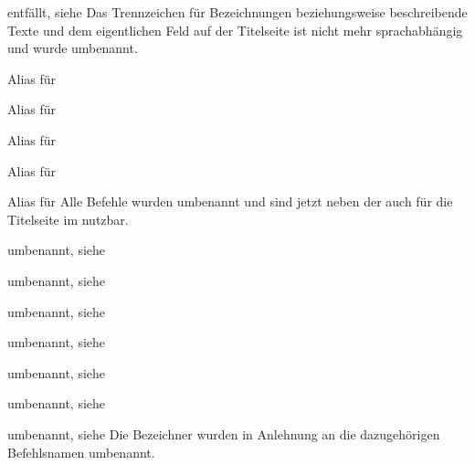 \begin{Declaration}{}{%
  entfällt, siehe %
}
\printdeclarationlist*%
%
Das Trennzeichen für Bezeichnungen beziehungsweise beschreibende Texte und dem 
eigentlichen Feld auf der Titelseite ist nicht mehr sprachabhängig und wurde 
umbenannt.
\end{Declaration}

\begin{Declaration}{}{%
  Alias für %
}
\begin{Declaration}{}{%
  Alias für %
}
\begin{Declaration}{}{%
  Alias für 
}
\begin{Declaration}{}{%
  Alias für 
}
\begin{Declaration}{}{%
  Alias für %
}
\printdeclarationlist*%
%
Alle Befehle wurden umbenannt und sind jetzt neben der \taskname{} auch für die 
Titelseite im \CD nutzbar.
\end{Declaration}
\end{Declaration}
\end{Declaration}
\end{Declaration}
\end{Declaration}

\begin{Declaration}{}{umbenannt, siehe }
\begin{Declaration}{}{%
  umbenannt, siehe %
}
\begin{Declaration}{}{%
  umbenannt, siehe %
}
\begin{Declaration}{}{%
  umbenannt, siehe %
}
\begin{Declaration}{}{%
  umbenannt, siehe %
}
\begin{Declaration}{}{%
  umbenannt, siehe %
}
\begin{Declaration}{}{%
  umbenannt, siehe %
}
\printdeclarationlist*%
%
Die Bezeichner wurden in Anlehnung an die dazugehörigen Befehlsnamen umbenannt.
\end{Declaration}
\end{Declaration}
\end{Declaration}
\end{Declaration}
\end{Declaration}
\end{Declaration}
\end{Declaration}

